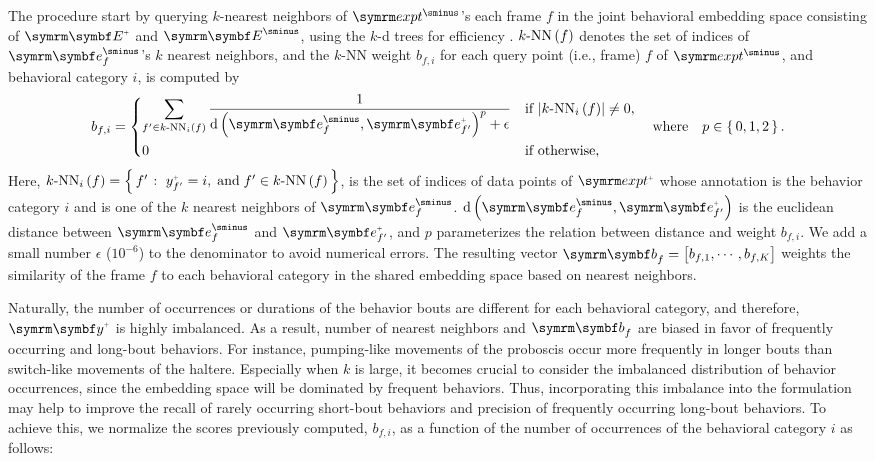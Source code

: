 The procedure start by querying $k$-nearest neighbors of $\exptUnann$'s each frame $f$ in the joint behavioral embedding space consisting of $\Ann{\V{E}}$ and $\Unann{\V{E}}$, using the $k$-d trees for efficiency \citep{bentley_multidimensional_1975}. ${k\mathrm{\textnormal{-}NN}} \left( f \right)$ denotes the set of indices of $\Unann{\V{e}}_f$'s $k$ nearest neighbors, and the $k$-NN weight $b_{f,i}$ for each query point (i.e., frame) $f$ of $\exptUnann$, and behavioral category $i$, is computed by
\begin{equation}
	b_{f,i} = \begin{dcases}
		\sum_{f^\prime \in \NNi{k}{i}{f}}\frac{1}{\dist{\Unann{\V{e}}_f}{\Ann{\V{e}}_{f^\prime}}^p + \epsilon} & \textnormal{if } \card{\NNi{k}{i}{f}} \neq 0, \\
		0                                                                                                      & \textnormal{if otherwise},
	\end{dcases} \qbwhere p \in \set{0,1,2}.
\end{equation}
Here, $\NNi{k}{i}{f}=\Set{f^\prime}{\Ann{y}_{f^\prime}=i, \dband f^\prime \in \NN{k}{f}}$, is the set of indices of data points of $\exptAnn$ whose annotation is the behavior category $i$ and is one of the $k$ nearest neighbors of $\Unann{\V{e}}_f$.
$\dist{\Unann{\V{e}}_f}{\Ann{\V{e}}_{f^\prime}}$ is the euclidean distance between $\Unann{\V{e}}_f$ and $\Ann{\V{e}}_{f^\prime}$, and $p$ parameterizes the relation between distance and weight $b_{f,i}$.
We add a small number $\epsilon$ ($10^{{-}6}$) to the denominator to avoid numerical errors.
The resulting vector $\V{b}_f = \qmatrix{b_{f,1}, \cdots, b_{f,K}}$ weights the similarity of the frame $f$ to each behavioral category in the shared embedding space based on nearest neighbors.

Naturally, the number of occurrences or durations of the behavior bouts are different for each behavioral category, and therefore, $\Ann{\V{y}}$ is highly imbalanced.
As a result, number of nearest neighbors and $\V{b}_f$ are biased in favor of frequently occurring and long-bout behaviors.
For instance, pumping-like movements of the proboscis occur more frequently in longer bouts than switch-like movements of the haltere.
Especially when $k$ is large, it becomes crucial to consider the imbalanced distribution of behavior occurrences, since the embedding space will be dominated by frequent behaviors.
Thus, incorporating this imbalance into the formulation may help to improve the recall of rarely occurring short-bout behaviors and precision of frequently occurring long-bout behaviors.
To achieve this, we normalize the scores previously computed, $b_{f,i}$, as a function of the number of occurrences of the behavioral category $i$ as follows:

